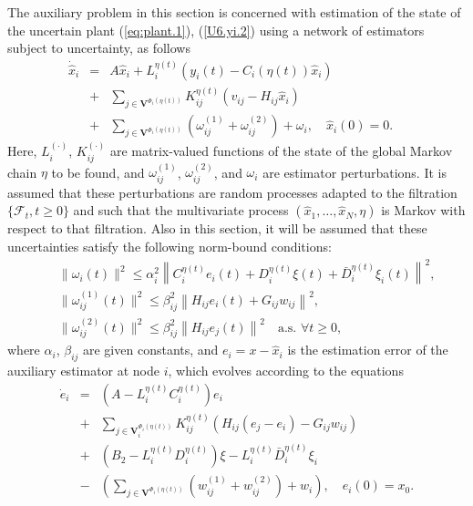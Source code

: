 \documentclass[a4paper,twocolumn]{autart}
\begin{document}
The auxiliary problem in this section is concerned with estimation of the
state of the uncertain plant (\ref{eq:plant.1}), (\ref{U6.yi.2}) using a
network of estimators subject to uncertainty, as follows 
\begin{eqnarray}
    \dot{\hat x}_i&=&A\hat x_i +
    L_i^{\eta(t)}(y_i(t)-C_i(\eta(t))\hat x_i)\nonumber \\
    &+&\sum_{j\in
      \mathbf{V}^{\Phi_i(\eta(t))}} K_{ij}^{\eta(t)}(v_{ij}-H_{ij}\hat
    x_i) \nonumber \\
&+&\sum_{j\in
      \mathbf{V}^{\Phi_i(\eta(t))}}(\omega_{ij}^{(1)}+\omega_{ij}^{(2)})+\omega_i,  
  \label{UP7.C.d.2} \quad \hat x_i(0)=0. \quad
\end{eqnarray}
Here, $L_i^{(\cdot)}$, $K_{ij}^{(\cdot)}$  are matrix-valued functions of the 
state of the global Markov chain $\eta$ to be found, and $\omega_{ij}^{(1)}$,
$\omega_{ij}^{(2)}$, and $\omega_i$ are estimator perturbations. It is
assumed that these perturbations are random processes adapted to the filtration
$\{\mathcal{F}_t,t\ge 0\}$ and such that the multivariate process 
$(\hat x_1,\ldots, \hat x_N,\eta)$ is Markov with respect to that
filtration. Also in this section, it will be assumed that these
uncertainties satisfy the following norm-bound conditions:
\begin{eqnarray}
&&\|\omega_i(t)\|^2 \le \alpha_i^2
\left\|C_i^{\eta(t)}e_i(t)+D_i^{\eta(t)}\xi(t)+\bar
  D_i^{\eta(t)}\xi_i(t)\right\|^2, \nonumber \\ 
&&\|\omega_{ij}^{(1)}(t)\|^2\le \beta_{ij}^2
\left\|H_{ij}e_i(t)+G_{ij}w_{ij}\right\|^2, \nonumber \\
&&\|\omega_{ij}^{(2)}(t)\|^2\le \beta_{ij}^2
\left\|H_{ij}e_j(t)\right\|^2 \quad \mbox{a.s. } \forall t\ge 0,  \label{wv.constr} 
\end{eqnarray}
where $\alpha_i$, $\beta_{ij}$ are given constants, and  
$e_i=x-\hat x_i$ is the estimation error of the auxiliary estimator 
at node $i$, which evolves 
according to the
equations 
 \begin{eqnarray}
    \dot{e}_i&=&(A - L_i^{\eta(t)}C_i^{\eta(t)})e_i\nonumber \\
    &+& \sum_{j\in 
      \mathbf{V}_i^{\Phi_i(\eta(t))}} K_{ij}^{\eta(t)}(H_{ij}(e_j-e_i)-G_{ij}w_{ij}) \nonumber \\
    &+&(B_2-L_i^{\eta(t)}D_i^{\eta(t)})\xi- L_i^{\eta(t)}{\bar
      D_i^{\eta(t)}}\xi_i \nonumber \\
&-& \left(\sum_{j\in
      \mathbf{V}^{\Phi_i(\eta(t))}}(w_{ij}^{(1)}+w_{ij}^{(2)})+w_i\right),
  \quad e_i(0)=x_0.   \label{e.w} 
\end{eqnarray}
\end{document}
